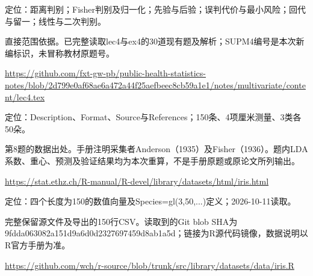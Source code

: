 \par\noindent\begin{minipage}{\linewidth}\label{src:NOTE-M4}
\par
定位：距离判别；Fisher判别及归一化；先验与后验；误判代价与最小风险；回代与留一；线性与二次判别。\par
直接范围依据。已完整读取lec4与ex4的30道现有题及解析；SUPM4编号是本次新编标识，未冒称教材原题号。\par
{\small\url{https://github.com/fxt-gw-pb/public-health-statistics-notes/blob/2d799e0af68ae6a472a44f25aefbeec8cb59a1e1/notes/multivariate/content/lec4.tex}}\par
\end{minipage}\par\medskip

\par\noindent\begin{minipage}{\linewidth}\label{src:IRIS-RDOC}
\par
定位：Description、Format、Source与References；150条、4项厘米测量、3类各50朵。\par
第8题的数据出处。手册注明采集者Anderson（1935）及Fisher（1936）。题内LDA系数、重心、预测及验证结果均为本次重算，不是手册原题或原论文所列输出。\par
{\small\url{https://stat.ethz.ch/R-manual/R-devel/library/datasets/html/iris.html}}\par
\end{minipage}\par\medskip

\par\noindent\begin{minipage}{\linewidth}\label{src:IRIS-SOURCE}
\par
定位：四个长度为150的数值向量及Species=gl(3,50,...)定义；2026-10-11读取。\par
完整保留源文件及导出的150行CSV。读取到的Git blob SHA为9fdda063082a151d9a6d0d2327697459d8ab1a5d；链接为R源代码镜像，数据说明以R官方手册为准。\par
{\small\url{https://github.com/wch/r-source/blob/trunk/src/library/datasets/data/iris.R}}\par
\end{minipage}\par\medskip

